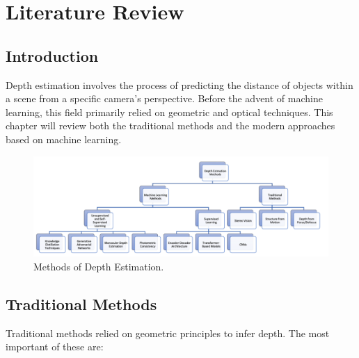 \chapter{Literature Review}
\label{chap:literature_review}

\section{Introduction}
\label{sec:lit_review_intro}

Depth estimation involves the process of predicting the distance of objects within a scene from a specific camera's perspective. Before the advent of machine learning, this field primarily relied on geometric and optical techniques. This chapter will review both the traditional methods and the modern approaches based on machine learning.

\begin{figure}[htbp!]
    \centering
    \includegraphics[width=\textwidth]{images/flowchart.png}
    \caption{Methods of Depth Estimation.}
    \label{fig:depth_methods_flowchart}
\end{figure}

\section{Traditional Methods}
\label{sec:traditional_methods}

Traditional methods relied on geometric principles to infer depth. The most important of these are:

